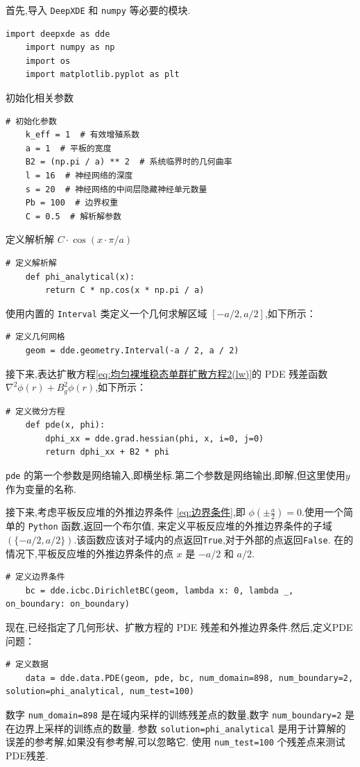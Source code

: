 \documentclass{Sichuan Normal University}
\begin{document}
\noindent
首先,导入 \texttt{DeepXDE} 和 \texttt{numpy} 等必要的模块.
\begin{lstlisting}[style=python,basicstyle=\footnotesize\fontspec{Courier New},]  
    import deepxde as dde
    import numpy as np
    import os
    import matplotlib.pyplot as plt
\end{lstlisting}
初始化相关参数
\begin{lstlisting}[style=python,basicstyle=\footnotesize\fontspec{Courier New},]  
    # 初始化参数
    k_eff = 1  # 有效增殖系数
    a = 1  # 平板的宽度
    B2 = (np.pi / a) ** 2  # 系统临界时的几何曲率
    l = 16  # 神经网络的深度
    s = 20  # 神经网络的中间层隐藏神经单元数量
    Pb = 100  # 边界权重
    C = 0.5  # 解析解参数
\end{lstlisting}
定义解析解 $C\cdot\cos(x\cdot\pi/a)$
\begin{lstlisting}[style=python,basicstyle=\footnotesize\fontspec{Courier New},]  
    # 定义解析解
    def phi_analytical(x):
        return C * np.cos(x * np.pi / a)    
\end{lstlisting}
使用内置的 \texttt{Interval} 类定义一个几何求解区域 $[-a/2,a/2]$,如下所示：
\begin{lstlisting}[style=python,basicstyle=\footnotesize\fontspec{Courier New},]  
    # 定义几何网格
    geom = dde.geometry.Interval(-a / 2, a / 2)    
\end{lstlisting}
接下来,表达扩散方程\eqref{eq:均匀裸堆稳态单群扩散方程2(lw)}的 PDE 残差函数$\nabla^2 \phi(r)+B_g^2 \phi(r)$,如下所示：

\begin{lstlisting}[style=python,basicstyle=\footnotesize\fontspec{Courier New},]  
    # 定义微分方程
    def pde(x, phi):
        dphi_xx = dde.grad.hessian(phi, x, i=0, j=0)
        return dphi_xx + B2 * phi
\end{lstlisting}
\texttt{pde} 的第一个参数是网络输入,即横坐标.第二个参数是网络输出,即解,但这里使用$y$作为变量的名称.

接下来,考虑平板反应堆的外推边界条件 \eqref{eq:边界条件},即 $\phi(\pm\frac{a}{2})=0$.使用一个简单的 \texttt{Python} 函数,返回一个布尔值,
来定义平板反应堆的外推边界条件的子域$(\{-a/2,a/2\})$.该函数应该对子域内的点返回\texttt{True},对于外部的点返回\texttt{False}.
在的情况下,平板反应堆的外推边界条件的点 $x$ 是 $-a/2$ 和 $a/2$.
\begin{lstlisting}[style=python,basicstyle=\footnotesize\fontspec{Courier New},]  
    # 定义边界条件
    bc = dde.icbc.DirichletBC(geom, lambda x: 0, lambda _, on_boundary: on_boundary)
\end{lstlisting}
现在,已经指定了几何形状、扩散方程的 PDE 残差和外推边界条件.然后,定义PDE问题：
\begin{lstlisting}[style=python,basicstyle=\footnotesize\fontspec{Courier New},]  
    # 定义数据
    data = dde.data.PDE(geom, pde, bc, num_domain=898, num_boundary=2, solution=phi_analytical, num_test=100)
\end{lstlisting}
数字 \texttt{num\_domain=898} 是在域内采样的训练残差点的数量,数字 \texttt{num\_boundary=2} 是在边界上采样的训练点的数量.
参数 \texttt{solution=phi\_analytical} 是用于计算解的误差的参考解,如果没有参考解,可以忽略它.
使用 \texttt{num\_test=100} 个残差点来测试PDE残差.
\end{document}
